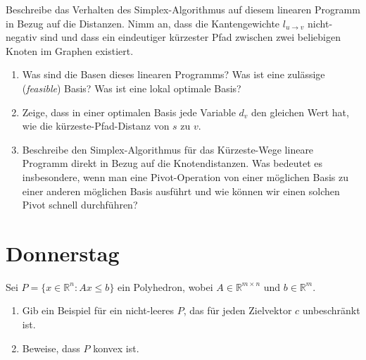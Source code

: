 \documentclass{uebung_cs}
\begin{document}
\begin{aufgabe}
	Beschreibe das Verhalten des Simplex-Algorithmus auf diesem linearen Programm in Bezug auf die Distanzen. Nimm an, dass die Kantengewichte $l_{u \rightarrow v}$ nicht-negativ sind und dass ein eindeutiger kürzester Pfad zwischen zwei beliebigen Knoten im Graphen existiert.
	\begin{enumerate}
		\item Was sind die Basen dieses linearen Programms? Was ist eine zulässige (\textit{feasible}) Basis? Was ist eine lokal optimale Basis?
		\item Zeige, dass in einer optimalen Basis jede Variable $d_v$ den gleichen Wert hat, wie die kürzeste-Pfad-Distanz von $s$ zu $v$.
		\item Beschreibe den Simplex-Algorithmus für das Kürzeste-Wege lineare Programm direkt in Bezug auf die Knotendistanzen. Was bedeutet es insbesondere, wenn man eine Pivot-Operation von einer möglichen Basis zu einer anderen möglichen Basis ausführt und wie können wir einen solchen Pivot schnell durchführen?
	\end{enumerate}
	
\end{aufgabe}

\section*{Donnerstag}

\begin{aufgabe}[Polyeder]
	Sei $P=\{ x\in \mathbb{R}^n : Ax\leq b \}$ ein Polyhedron, wobei $A\in \mathbb{R}^{m\times n}$ und $b\in \mathbb{R}^m$.
	\begin{enumerate}
		\item Gib ein Beispiel für ein nicht-leeres $P$, das für jeden Zielvektor $c$ unbeschränkt ist.
		\item Beweise, dass $P$ konvex ist.
	\end{enumerate}
\end{aufgabe}
\end{document}
